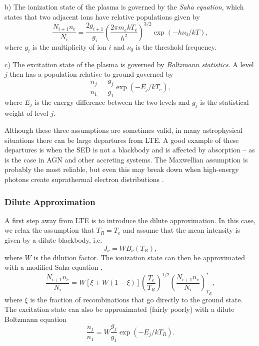 \smallskip

b) The ionization state of the plasma is governed by the {\em Saha equation},
which states that two adjacent ions have relative populations given by
\begin{equation}
\frac{N_{i+1}n_e}{N_i} = \frac{2g_{i+1}}{g_i} 
\left( \frac{2 \pi m_e kT_e}{h^2} \right)^{3/2}
\exp(-h \nu_0/kT),
\label{eq:saha}
\end{equation}
where $g_i$ is the multiplicity of ion $i$ and $\nu_0$ is the threshold frequency.

\smallskip

c) The excitation state of the plasma is governed by {\em Boltzmann statistics}.
A level $j$ then has a population relative to ground governed by
\begin{equation}
\frac{n_{j}}{n_1} = \frac{g_j}{g_1} \exp(-E_j/kT_e), 
\label{eq:boltzmann}
\end{equation}
where $E_j$ is the energy difference between the two levels and 
$g_j$ is the statistical weight of level $j$. 

\smallskip

Although these three assumptions are sometimes valid, in many astrophysical situations
there can be large departures from LTE. A good example of these departures is when
the SED is not a blackbody and is affected by absorption -- 
as is the case in AGN and other accreting systems. The Maxwellian assumption 
is probably the most reliable, but even this may break down
when high-energy photons create suprathermal electron distributions 
\citep{humphrey2014}. 

\subsubsection{Dilute Approximation}
\label{sec:dilute}
A first step away from LTE is to introduce the dilute approximation. In this case,
we relax the assumption that $T_R = T_e$ and assume that the mean intensity is given
by a dilute blackbody, i.e. 
\begin{equation}
J_\nu = W B_\nu (T_R),
\label{eq:dilute_jnu}
\end{equation}
where $W$ is the dilution factor. The ionization state can then be approximated 
with a modified Saha equation \citep{AL85,ML93},
\begin{equation}
\frac{N_{i+1} n_e}{N_i} = W [\xi + W(1-\xi)]
\left(\frac{T_e}{T_R}\right)^{1/2}
\left(\frac{N_{i+1}n_e}{N_i}\right)^*_{T_R}, \label{eq:ml93}
\end{equation}
where $\xi$ is the fraction of recombinations that go directly to
the ground state.
The excitation state can also be approximated (fairly poorly) 
with a dilute Boltzmann equation \citep{AL85,lucy1999sne}
\begin{equation}
\frac{n_{j}}{n_{1}} = W \frac{g_j}{g_{1}} \exp(-E_j/kT_R).
\label{eq:dilute_boltzmann}
\end{equation}

